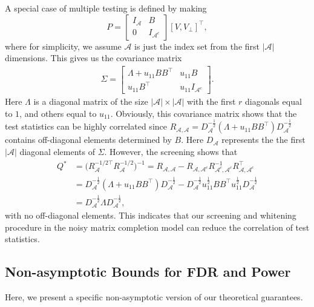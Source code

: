 \documentclass[12pt]{article}
\newcommand{\abs}[1]{\left\lvert#1\right\rvert}
\def\calA{{\mathcal A}}
\theoremstyle{plain}
\begin{document}
A special case of  multiple testing is defined by making 
\begin{equation*}
    P=\left[\begin{matrix} I_{\calA} & B \\0 & I_{\calA^{c} }
        \end{matrix}\right]\left[V, V_\perp\right]^{\top},
\end{equation*}
where for simplicity, we assume $\calA$ is just the index set from the first $\abs{\calA}$ dimensions. This gives us the covariance matrix
\begin{equation*}
\begin{aligned}
        \Sigma = \left[\begin{matrix} \Lambda +u_{11} BB^\top & u_{11}B \\u_{11}B^\top & u_{11} I_{\calA^{c} }
        \end{matrix}\right].
\end{aligned}
\end{equation*}
Here $\Lambda$ is a diagonal matrix of the size $\abs{\calA}\times\abs{\calA}$  with the first $r$ diagonals equal to $1$, and others equal to $u_{11}$.
Obviously, this covariance matrix shows that the test statistics can be highly correlated since $R_{\calA,\calA} = D_{\calA}^{-\frac{1}{2}}\left( \Lambda +u_{11} BB^\top \right)D_{\calA}^{-\frac{1}{2}}  $ contains off-diagonal elements determined by $B$. Here $D_{\calA}$ represents the the first $\abs{\calA}$ diagonal elements of $\Sigma$. However, the screening shows that
\begin{equation*}
\begin{aligned}
        Q^{\ast}&=\big(R_{\calA}^{-1/2\top} R_{\calA}^{-1/2}\big)^{-1}=R_{\calA,\calA} - R_{\calA,\calA^c}R_{\calA^c,\calA^c}^{-1}R_{\calA,\calA^c}^\top \\
        &=  D_{\calA}^{-\frac{1}{2}}\left( \Lambda +u_{11} BB^\top \right)D_{\calA}^{-\frac{1}{2}} -   D_{\calA}^{-\frac{1}{2}}  u_{11}^{\frac{1}{2}} B B^\top  u_{11}^{\frac{1}{2}} D_{\calA}^{-\frac{1}{2}} \\
        & =  D_{\calA}^{-\frac{1}{2}} \Lambda D_{\calA}^{-\frac{1}{2}},
\end{aligned}
\end{equation*}
with no off-diagonal elements. This indicates that our screening and whitening procedure in the noisy matrix completion model can reduce the correlation of test statistics.

\subsection{Non-asymptotic Bounds for FDR and Power}\label{sec:non-saymp-results}
Here, we present a specific non-asymptotic version of our theoretical guarantees.
\end{document}

